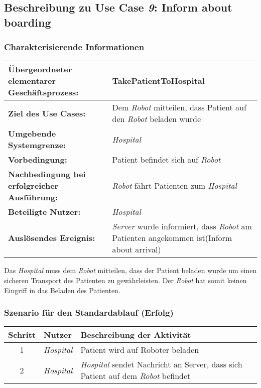 	\pagebreak
		\subsection{Beschreibung zu Use Case \emph{9}: Inform about boarding}

			\subsubsection*{Charakterisierende Informationen}

			\begin{table}[H]
				\centering
				\begin{tabularx}{\textwidth}{@{}p{5cm}X@{}}
				\hline
				\textbf{Übergeordneter elementarer Geschäftsprozess:} & TakePatientToHospital   \\ \hline
				\textbf{Ziel des Use Cases:} & Dem \emph{Robot} mitteilen, dass Patient auf den \emph{Robot} beladen wurde \\ \hline
				\textbf{Umgebende Systemgrenze:} & \emph{Hospital} \\ \hline
				\textbf{Vorbedingung:} & Patient befindet sich auf \emph{Robot}\\ \hline
				\textbf{Nachbedingung bei erfolgreicher Ausführung:} & \emph{Robot} fährt Patienten zum \emph{Hospital} \\ \hline
				\textbf{Beteiligte Nutzer:} & \emph{Hospital}\\ \hline
				\textbf{Auslösendes Ereignis:} & \emph{Server} wurde informiert, dass \emph{Robot} am Patienten angekommen ist(Inform about arrival)\\
				\hline
				\end{tabularx}
			\end{table}
			
			Das \emph{Hospital} muss dem \emph{Robot} mitteilen, dass der Patient beladen wurde um einen sicheren Transport des Patienten zu gewährleisten. Der \emph{Robot} hat somit keinen Eingriff in das Beladen des Patienten.

			\subsubsection*{Szenario für den Standardablauf (Erfolg)}

			\begin{table}[H]
				\centering
				\begin{tabularx}{\textwidth}{@{}cp{2cm}X@{}}
				\hline
				Schritt & Nutzer & Beschreibung der Aktivität \\ \hline
				1 & \emph{Hospital} & Patient wird auf Roboter beladen \\
				2 & \emph{Hospital} & \emph{Hospital} sendet Nachricht an Server, dass sich Patient auf dem \emph{Robot} befindet \\
				\hline
				\end{tabularx}
			\end{table}


	\pagebreak
